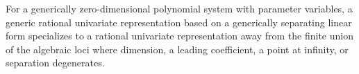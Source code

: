 For a generically zero-dimensional polynomial system with parameter variables, a generic rational univariate representation based on a generically separating linear form specializes to a rational univariate representation away from the finite union of the algebraic loci where dimension, a leading coefficient, a point at infinity, or separation degenerates.
